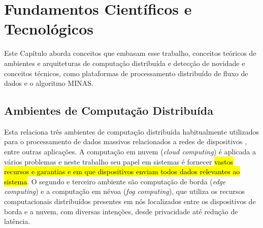 \chapter{Fundamentos Científicos e Tecnológicos}\label{cha:fundamentos}



\begin{resumocap}
  Este Capítulo aborda conceitos que embasam esse trabalho,
  conceitos teóricos de
  ambientes e arquiteturas de computação distribuída e detecção de novidade
  e conceitos técnicos, como plataformas de processamento distribuído de fluxo
  de dados e o algoritmo MINAS.
\end{resumocap}

\section{Ambientes de Computação Distribuída}

\newcommand{\cloud}{\emph{cloud computing}\xspace}


Esta \Section relaciona três ambientes de computação distribuída habitualmente
utilizados para o processamento de dados massivos relacionados a redes de
dispositivos \iot, entre outras aplicações.
A computação em nuvem (\cloud) é
aplicada a vários problemas e neste trabalho seu papel em sistemas \iot é
fornecer \hl{vastos recursos e garantias e em que dispositivos enviam todos
dados relevantes ao sistema}.
O segundo e terceiro ambiente são computação de borda (\emph{edge computing})
e a computação em névoa (\emph{fog computing}), que utiliza os recursos
computacionais distribuídos presentes em nós localizados entre os dispositivos
de borda e a nuvem, com diversas intenções, desde privacidade até redução de
latência.

